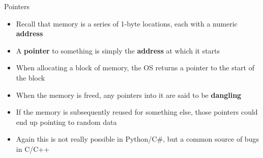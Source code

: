 \begin{frame}{Pointers}
    \begin{itemize}
        \pause\item Recall that memory is a series of 1-byte locations, each with a numeric \textbf{address}
        \pause\item A \textbf{pointer} to something is simply the \textbf{address} at which it starts
        \pause\item When allocating a block of memory, the OS returns a pointer to the start of the block
        \pause\item When the memory is freed, any pointers into it are said to be \textbf{dangling}
        \pause\item If the memory is subsequently reused for something else, those pointers could end up
            pointing to random data
        \pause\item Again this is not really possible in Python/C\#, but a common source of bugs in C/C++
    \end{itemize}
\end{frame}
